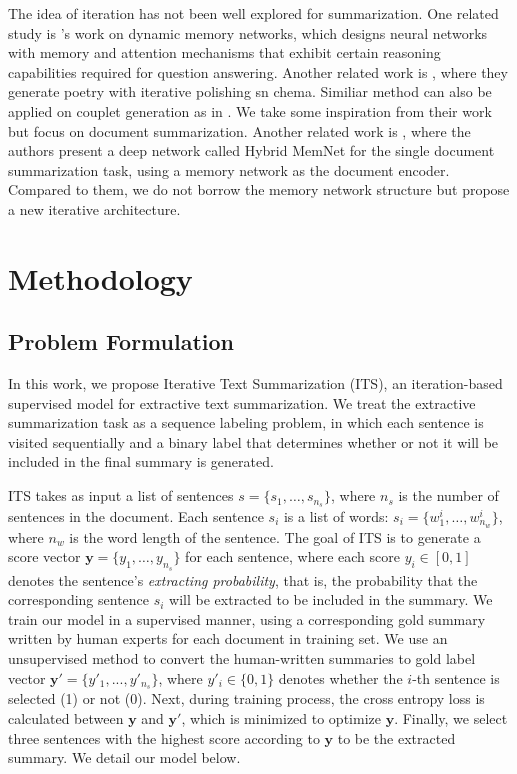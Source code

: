 \documentclass[11pt,a4paper]{article}
\begin{document}
The idea of iteration has not been well explored for summarization. 
One related study is \citet{Xiong2016Dynamic}'s work on dynamic memory networks, which designs neural networks with memory and attention mechanisms that exhibit certain reasoning capabilities required for question answering. 
Another related work is \cite{yan2016poet}, where they generate poetry with iterative polishing sn
chema. Similiar method can also be applied on couplet generation as in \cite{Yan2016Chinese}.
We take some inspiration from their work but focus on document summarization.
Another related work is \cite{Singh2017Hybrid}, where the authors present a deep network called Hybrid MemNet for the single document summarization task, using a memory network as the document encoder. 
Compared to them, we do not borrow the memory network structure but propose a new iterative architecture.


%
 
\section{Methodology}

\subsection{Problem Formulation}
In this work, we propose Iterative Text Summarization (ITS), an iteration-based supervised model for extractive text summarization. 
We treat the extractive summarization task as a sequence labeling problem, in which each sentence is visited sequentially and a binary label that determines whether or not it will be included in the final summary is generated.

ITS takes as input a list of sentences $ s = \{s_{1},\dots,s_{n_s}\}$, where $n_{s}$ is the number of sentences in the document. Each sentence $s_{i}$ is a list of words: $s_{i} = \{w_1^i,\dots,w_{n_w}^i\}$, where $n_w$ is the word length of the sentence.
The goal of ITS is to generate a score vector $\bm{y} = \{y_{1},\dots,y_{n_s}\}$ for each sentence, where each score $y_{i} \in [0,1]$ denotes the sentence's \textit{extracting probability}, that is, the probability that the corresponding sentence $s_i$ will be extracted to be included in the summary. 
We train our model in a supervised manner, using a corresponding gold summary written by human experts for each document in training set. We use an unsupervised method to convert the human-written summaries to gold label vector $\bm{y'}=\{y'_{1},...,y'_{n_{s}}\}$, where $y'_{i}\in \{0,1\}$ denotes whether the $i$-th sentence is selected (1) or not (0).
Next, during training process, the cross entropy loss is calculated between $\bm{y}$ and $\bm{y'}$, which is minimized to optimize $\bm{y}$.
Finally, we select three sentences with the highest score according to $\bm{y}$ to be the extracted summary. 
We detail our model below.
\end{document}
